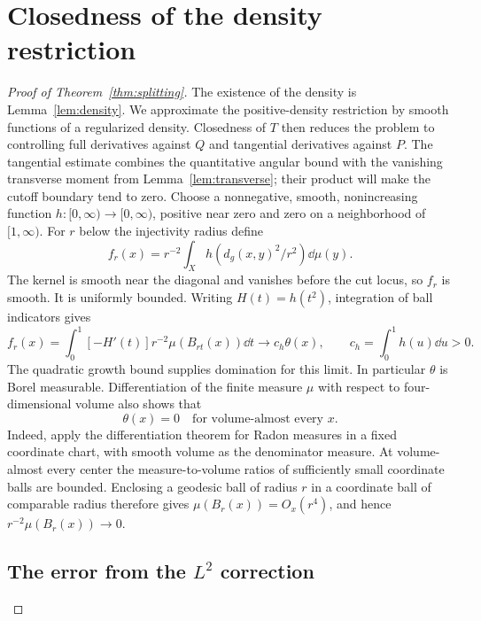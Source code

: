 \section{Closedness of the density restriction}
\label{sec:splitting}

\begin{proof}[Proof of Theorem~\ref{thm:splitting}]
The existence of the density is Lemma~\ref{lem:density}.
We approximate the positive-density restriction by smooth
functions of a regularized density. Closedness of \(T\) then
reduces the problem to controlling full derivatives against
\(Q\) and tangential derivatives against \(P\). The tangential
estimate combines the quantitative angular bound with the
vanishing transverse moment from Lemma~\ref{lem:transverse};
their product will make the cutoff boundary tend to zero.
Choose a nonnegative, smooth, nonincreasing function
\(h:[0,\infty)\to[0,\infty)\), positive near zero and zero
on a neighborhood of \([1,\infty)\). For \(r\) below the
injectivity radius define
\begin{equation}\label{eq:density-cutoff}
f_r(x)=r^{-2}\int_Xh(d_g(x,y)^2/r^2)\dd\mu(y).
\end{equation}
The kernel is smooth near the diagonal and vanishes before
the cut locus, so \(f_r\) is smooth. It is uniformly bounded.
Writing \(H(t)=h(t^2)\), integration of ball indicators gives
\[
f_r(x)=\int_0^1[-H'(t)]r^{-2}\mu(B_{rt}(x))\dd t
 \longrightarrow c_h\theta(x),
\qquad
c_h=\int_0^1h(u)\dd u>0.
\]
The quadratic growth bound supplies domination for this
limit. In particular \(\theta\) is Borel measurable.
Differentiation of the finite measure \(\mu\) with respect
to four-dimensional volume also shows that
\begin{equation}\label{eq:theta-volume}
\theta(x)=0\quad\text{for volume-almost every }x.
\end{equation}
Indeed, apply the differentiation theorem for Radon measures
\cite[Theorem~4.19]{Kinnunen2026} in a fixed coordinate chart,
with smooth volume as the denominator measure. At
volume-almost every center the measure-to-volume ratios
of sufficiently small coordinate balls are bounded.
Enclosing a geodesic ball of radius \(r\) in a coordinate
ball of comparable radius therefore gives
\(\mu(B_r(x))=O_x(r^4)\), and hence
\(r^{-2}\mu(B_r(x))\to0\).

\subsection*{The error from the \(L^2\) correction}


\end{proof}
